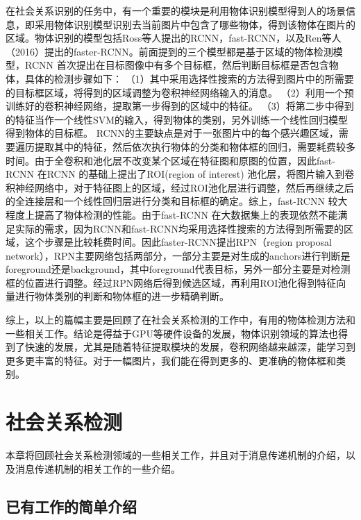 在社会关系识别的任务中，有一个重要的模块是利用物体识别模型得到人的场景信息，即采用物体识别模型识别去当前图片中包含了哪些物体，得到该物体在图片的区域。物体识别的模型包括Ross等人提出的RCNN\cite{girshick2014rich}，fast-RCNN\cite{girshick2015fast}，以及Ren等人（2016）\cite{ren2015faster}提出的faster-RCNN。前面提到的三个模型都是基于区域的物体检测模型，RCNN\cite{girshick2014rich} 首次提出在目标图像中有多个目标框，然后判断目标框是否包含物体，具体的检测步骤如下：
（1）其中采用选择性搜索的方法得到图片中的所需要的目标框区域，将得到的区域调整为卷积神经网络输入的消息。
（2）利用一个预训练好的卷积神经网络，提取第一步得到的区域中的特征。
（3）将第二步中得到的特征当作一个线性SVM的输入，得到物体的类别，另外训练一个线性回归模型得到物体的目标框。
RCNN的主要缺点是对于一张图片中的每个感兴趣区域，需要遍历提取其中的特征，然后依次执行物体的分类和物体框的回归，需要耗费较多时间。由于全卷积和池化层不改变某个区域在特征图和原图的位置，因此fast-RCNN 在RCNN 的基础上提出了ROI(region of interest) 池化层，将图片输入到卷积神经网络中，对于特征图上的区域，经过ROI池化层进行调整，然后再继续之后的全连接层和一个线性回归层进行分类和目标框的确定。综上，fast-RCNN 较大程度上提高了物体检测的性能。由于fast-RCNN 在大数据集上的表现依然不能满足实际的需求，因为RCNN和fast-RCNN均采用选择性搜索的方法得到所需要的区域，这个步骤是比较耗费时间。因此faster-RCNN提出RPN（region proposal network），RPN主要网络包括两部分，一部分主要是对生成的anchors进行判断是foreground还是background，其中foreground代表目标，另外一部分主要是对检测框的位置进行调整。经过RPN网络后得到候选区域，再利用ROI池化得到特征向量进行物体类别的判断和物体框的进一步精确判断。

综上，以上的篇幅主要是回顾了在社会关系检测的工作中，有用的物体检测方法和一些相关工作。结论是得益于GPU等硬件设备的发展，物体识别领域的算法也得到了快速的发展，尤其是随着特征提取模块的发展，卷积网络越来越深，能学习到更多更丰富的特征。对于一幅图片，我们能在得到更多的、更准确的物体框和类别。

\section{社会关系检测}
本章将回顾社会关系检测领域的一些相关工作，并且对于消息传递机制的介绍，以及消息传递机制的相关工作的一些介绍。

\subsection{已有工作的简单介绍}

